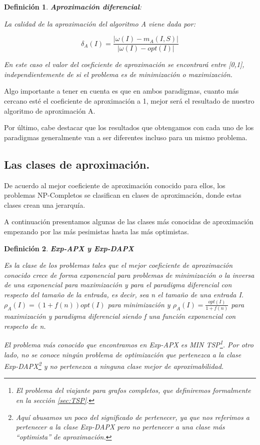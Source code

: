 \documentclass[a4paper,12pt,titlepage]{article}
\newtheorem{defi}{Definici\'on}[section]
\begin{document}
\begin{defi}

\textbf{Aproximaci\'on diferencial}:

La calidad de la aproximaci\'on del algoritmo A viene dada por:

\begin{equation}
\delta_{A}(I)=\frac{|\omega(I)-m_{A}(I,S)|}{|\omega(I)-opt(I)|}
\end{equation}

En este caso el valor del coeficiente de aproximaci\'on se encontrar\'a entre [0,1], independientemente de si el problema es de minimizaci\'on o maximizaci\'on.

\end{defi}

Algo importante a tener en cuenta es que en ambos paradigmas, cuanto m\'as cercano est\'e el coeficiente de aproximaci\'on a 1, mejor ser\'a el resultado de nuestro algoritmo de aproximaci\'on A.

Por \'ultimo, cabe destacar que los resultados que obtengamos con cada uno de los paradigmas generalmente van a ser diferentes incluso para un mismo problema.

\subsection{Las clases de aproximaci\'on.}

De acuerdo al mejor coeficiente de aproximaci\'on conocido para ellos, los problemas NP-Completos se clasifican en clases de aproximaci\'on, donde estas clases crean una jerarqu\'ia.

A continuaci\'on presentamos algunas de las clases m\'as conocidas de aproximaci\'on empezando por las m\'as pesimistas hasta las m\'as optimistas.

\begin{defi}

\textbf{Exp-APX y Exp-DAPX}

Es la clase de los problemas tales que el mejor coeficiente de aproximaci\'on conocido crece de forma exponencial para problemas de minimizaci\'on o la inversa de una exponencial para maximizaci\'on y para el paradigma diferencial con respecto del tamaño de la entrada, es decir, sea n el tamaño de una entrada I.
$\rho_{A}(I)=(1+f(n))opt(I)$ para minimizaci\'on y $\rho_{A}(I)=\frac{opt(I)}{1+f(n)}$ para maximizaci\'on y paradigma diferencial siendo f una funci\'on exponencial con respecto de n.

El problema m\'as conocido que encontramos en Exp-APX es MIN TSP\footnote{El problema del viajante para grafos completos, que definiremos formalmente en la secci\'on \ref{sec:TSP}.}. Por otro lado, no se conoce ning\'un problema de optimizaci\'on que pertenezca a la clase Exp-DAPX\footnote{Aqu\'i abusamos un poco del significado de pertenecer, ya que nos referimos a pertenecer a la clase Exp-DAPX pero no pertenecer a una clase m\'as ``optimista'' de aproximaci\'on.} y no pertenezca a ninguna clase mejor de aproximabilidad.

\end{defi}
\end{document}
